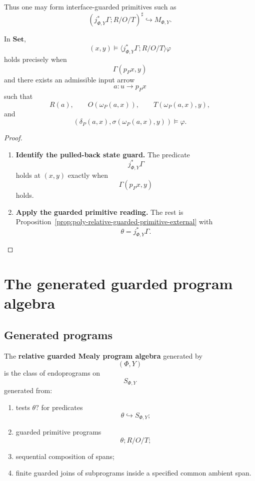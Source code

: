 Thus one may form interface-guarded primitives such as
\[
(j_{\Phi,Y}^\ast\Gamma;R/O/T)^\sharp
\hookrightarrow M_{\Phi,Y}.
\]

\begin{proposition}
\label{prop:poly-relative-interface-guard-external}
In \(\mathbf{Set}\),
\[
(x,y)\models
\langle j_{\Phi,Y}^\ast\Gamma;R/O/T\rangle\varphi
\]
holds precisely when
\[
\Gamma(p_Px,y)
\]
and there exists an admissible input arrow
\[
a:u\to p_Px
\]
such that
\[
R(a),
\qquad
O(\omega_P(a,x)),
\qquad
T(\omega_P(a,x),y),
\]
and
\[
\left(
\delta_P(a,x),
\sigma(\omega_P(a,x),y)
\right)
\models\varphi.
\]
\end{proposition}

\begin{proof}
\leavevmode
\begin{enumerate}
\item \textbf{Identify the pulled-back state guard.}
The predicate
\[
j_{\Phi,Y}^\ast\Gamma
\]
holds at \((x,y)\) exactly when
\[
\Gamma(p_Px,y)
\]
holds.

\item \textbf{Apply the guarded primitive reading.}
The rest is Proposition~\ref{prop:poly-relative-guarded-primitive-external}
with
\[
\theta=j_{\Phi,Y}^\ast\Gamma.
\]
\end{enumerate}
\end{proof}

\section{The generated guarded program algebra}
\label{sec:poly-relative-generated-program-algebra}

\subsection{Generated programs}
\label{subsec:poly-relative-generated-programs}

\begin{definition}
\label{def:poly-relative-guarded-program-algebra}
The \textbf{relative guarded Mealy program algebra} generated by
\[
(\Phi,Y)
\]
is the class of endoprograms on
\[
S_{\Phi,Y}
\]
generated from:
\begin{enumerate}
\item tests \(\theta?\) for predicates
\[
\theta\hookrightarrow S_{\Phi,Y};
\]
\item guarded primitive programs
\[
\theta;R/O/T;
\]
\item sequential composition of spans;
\item finite guarded joins of subprograms inside a specified common ambient
span.
\end{enumerate}
\end{definition}

